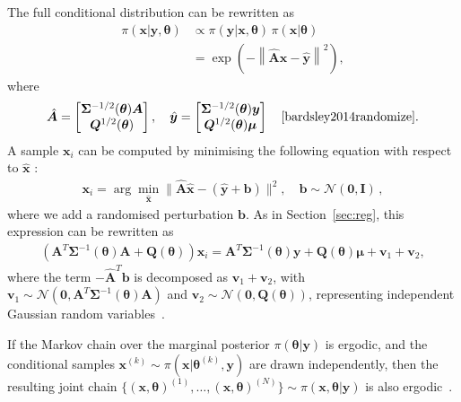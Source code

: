 The full conditional distribution can be rewritten as
\begin{align}
	\pi(\bm{x} |  \bm{y}, \bm{\theta}) &\propto \pi(\bm{y} |  \bm{x}, \bm{\theta}) \, \pi(\bm{x} |  \bm{\theta}) \\
	&= \exp \left( -\left\lVert \hat{\bm{A}} \bm{x} - \hat{\bm{y}} \right\rVert^2 \right),
\end{align}
where
\begin{align}
	\label{eq:minimizer}
	\hat{\bm{A}} = 
	\begin{bmatrix}
		\bm{\Sigma}^{-1/2}(\bm{\theta}) \bm{A} \\
		\bm{Q}^{1/2}(\bm{\theta})
	\end{bmatrix}, \quad 
	\hat{\bm{y}} = 
	\begin{bmatrix}
		\bm{\Sigma}^{-1/2}(\bm{\theta}) \bm{y} \\
		\bm{Q}^{1/2}(\bm{\theta}) \bm{\mu}
	\end{bmatrix} \quad \text{\cite{bardsley2014randomize}}.
\end{align}
A sample $\bm{x}_i $ can be computed by minimising the following equation with respect to $\hat{\bm{x}}$ :
\begin{align}
	\bm{x}_i = \arg \min_{\hat{\bm{x}}} \lVert \hat{\bm{A}} \hat{\bm{x}} - ( \hat{\bm{y}} + \bm{b} ) \rVert^2 , \quad \bm{b} \sim \mathcal{N}(\bm{0}, \mathbf{I}) \, ,
\end{align}
where we add a randomised perturbation $\bm{b}$.
As in Section~\ref{sec:reg}, this expression can be rewritten as
\begin{align}
	\label{eq:RTO}
	\left( \bm{A}^T \bm{\Sigma}^{-1}(\bm{\theta}) \bm{A} + \bm{Q}(\bm{\theta}) \right) \bm{x}_i = \bm{A}^T \bm{\Sigma}^{-1}(\bm{\theta}) \bm{y} + \bm{Q}(\bm{\theta}) \bm{\mu} + \bm{v}_1 + \bm{v}_2,
\end{align}
where the term $-\hat{\bm{A}}^T \bm{b}$ is decomposed as $\bm{v}_1 + \bm{v}_2$, with $\bm{v}_1 \sim \mathcal{N}(\bm{0}, \bm{A}^T \bm{\Sigma}^{-1}(\bm{\theta}) \bm{A})$ and $\bm{v}_2 \sim \mathcal{N}(\bm{0}, \bm{Q}(\bm{\theta}))$, representing independent Gaussian random variables~\cite{bardsley2012mcmc, fox2016fast}.

If the Markov chain over the marginal posterior $\pi(\bm{\theta} |  \bm{y})$ is ergodic, and the conditional samples $\bm{x}^{(k)} \sim \pi(\bm{x}|   \bm{\theta}^{(k)}, \bm{y})$ are drawn independently, then the resulting joint chain $\{ (\bm{x}, \bm{\theta})^{(1)}, \dots, (\bm{x}, \bm{\theta})^{(N)} \} \sim \pi(\bm{x}, \bm{\theta} |  \bm{y})$ is also ergodic~\cite{acosta2014markov}.

